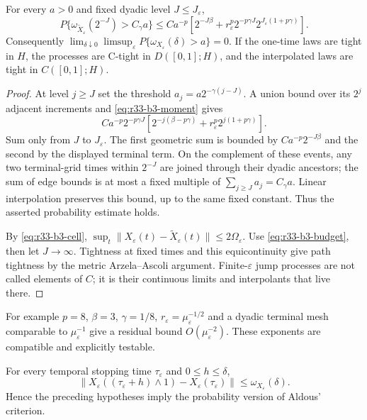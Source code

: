 \begin{theorem}
\label{thm:r33-b3-grid}
For every $a>0$ and fixed dyadic level $J\le J_\varepsilon$,
\[
 P\{\omega_{\widetilde X_\varepsilon}(2^{-J})>C_\gamma a\}
 \le C a^{-p}\left[
 2^{-J\beta}+r_\varepsilon^p 2^{-p\gamma J}
                         2^{J_\varepsilon(1+p\gamma)}\right].
\]
Consequently $\lim_{\delta\downarrow0}\limsup_\varepsilon
P\{\omega_{X_\varepsilon}(\delta)>a\}=0$.
If the one-time laws are tight in $H$, the processes are C-tight in $D([0,1];H)$, and the interpolated laws are tight in $C([0,1];H)$.
\end{theorem}

\begin{proof}
At level $j\ge J$ set the threshold $a_j=a2^{-\gamma(j-J)}$. A union bound over its $2^j$ adjacent increments and \eqref{eq:r33-b3-moment} gives
\[
 C a^{-p}2^{-p\gamma J}
 [2^{-j(\beta-p\gamma)}+r_\varepsilon^p2^{j(1+p\gamma)}].
\]
Sum only from $J$ to $J_\varepsilon$. The first geometric sum is bounded by $Ca^{-p}2^{-J\beta}$ and the second by the displayed terminal term. On the complement of these events, any two terminal-grid times within $2^{-J}$ are joined through their dyadic ancestors; the sum of edge bounds is at most a fixed multiple of $\sum_{j\ge J}a_j=C_\gamma a$. Linear interpolation preserves this bound, up to the same fixed constant. Thus the asserted probability estimate holds.

By \eqref{eq:r33-b3-cell}, $\sup_t\|X_\varepsilon(t)-\widetilde X_\varepsilon(t)\|\le2\Omega_\varepsilon$. Use \eqref{eq:r33-b3-budget}, then let $J\to\infty$. Tightness at fixed times and this equicontinuity give path tightness by the metric Arzela--Ascoli argument. Finite-$\varepsilon$ jump processes are not called elements of $C$; it is their continuous limits and interpolants that live there.
\end{proof}

For example $p=8$, $\beta=3$, $\gamma=1/8$, $r_\varepsilon=\mu_\varepsilon^{-1/2}$ and a dyadic terminal mesh comparable to $\mu_\varepsilon^{-1}$ give a residual bound $O(\mu_\varepsilon^{-2})$. These exponents are compatible and explicitly testable.

\begin{corollary}
For every temporal stopping time $\tau_\varepsilon$ and $0\le h\le\delta$,
\[
 \|X_\varepsilon((\tau_\varepsilon+h)\wedge1)-X_\varepsilon(\tau_\varepsilon)\|
 \le\omega_{X_\varepsilon}(\delta).
\]
Hence the preceding hypotheses imply the probability version of Aldous' criterion.
\end{corollary}

